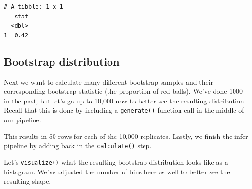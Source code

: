 \documentclass[12pt,]{krantz}
\makeatletter
\newenvironment{Shaded}{\begin{snugshade}}{\end{snugshade}}
\newcommand{\KeywordTok}[1]{\textcolor[rgb]{0.27,0.27,0.27}{\textbf{#1}}}
\newcommand{\DataTypeTok}[1]{\textcolor[rgb]{0.27,0.27,0.27}{#1}}
\newcommand{\DecValTok}[1]{\textcolor[rgb]{0.06,0.06,0.06}{#1}}
\newcommand{\StringTok}[1]{\textcolor[rgb]{0.5,0.5,0.5}{#1}}
\newcommand{\OtherTok}[1]{\textcolor[rgb]{0.37,0.37,0.37}{#1}}
\newcommand{\OperatorTok}[1]{\textcolor[rgb]{0.43,0.43,0.43}{\textbf{#1}}}
\newcommand{\NormalTok}[1]{#1}
\newenvironment{kframe}{%
\medskip{}
\setlength{\fboxsep}{.8em}
 \def\at@end@of@kframe{}%
 \ifinner\ifhmode%
  \def\at@end@of@kframe{\end{minipage}}%
  \begin{minipage}{\columnwidth}%
 \fi\fi%
 \def\FrameCommand##1{\hskip\@totalleftmargin \hskip-\fboxsep
 \colorbox{shadecolor}{##1}\hskip-\fboxsep
     \hskip-\linewidth \hskip-\@totalleftmargin \hskip\columnwidth}%
 \MakeFramed {\advance\hsize-\width
   \@totalleftmargin\z@ \linewidth\hsize
   \@setminipage}}%
 {\par\unskip\endMakeFramed%
 \at@end@of@kframe}
\renewenvironment{Shaded}{\begin{kframe}}{\end{kframe}}
\theoremstyle{definition}
\theoremstyle{definition}
\theoremstyle{definition}
\theoremstyle{remark}
\makeatother
\begin{document}
\begin{verbatim}
# A tibble: 1 x 1
   stat
  <dbl>
1  0.42
\end{verbatim}

\subsection{Bootstrap distribution}\label{bootstrap-distribution-1}

Next we want to calculate many different bootstrap samples and their
corresponding bootstrap statistic (the proportion of red balls). We've
done 1000 in the past, but let's go up to 10,000 now to better see the
resulting distribution. Recall that this is done by including a
\texttt{generate()} function call in the middle of our pipeline:

\begin{Shaded}
\end{Shaded}

This results in 50 rows for each of the 10,000 replicates. Lastly, we
finish the infer pipeline by adding back in the \texttt{calculate()}
step.

\begin{Shaded}
\end{Shaded}

Let's \texttt{visualize()} what the resulting bootstrap distribution
looks like as a histogram. We've adjusted the number of bins here as
well to better see the resulting shape.
\end{document}
